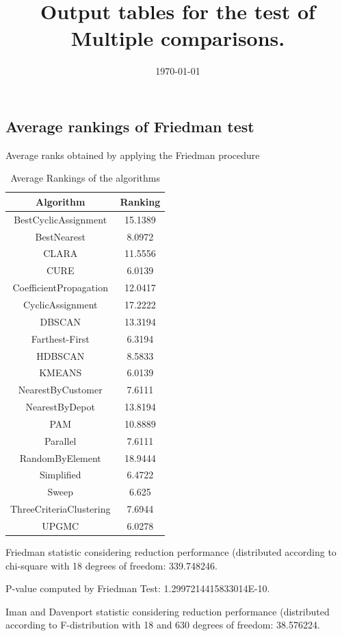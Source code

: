 \documentclass[a4paper,10pt]{article}
\title{Output tables for the test of Multiple comparisons.}
\author{}
\date{\today}
\begin{document}
\begin{landscape}
\pagestyle{empty}
\maketitle
\thispagestyle{empty}
\section{Average rankings of Friedman test}



Average ranks obtained by applying the Friedman procedure

\begin{table}[!htp]
\centering
\begin{tabular}{|c|c|}\hline
Algorithm&Ranking\\\hline
BestCyclicAssignment & 15.1389\\
BestNearest & 8.0972\\
CLARA & 11.5556\\
CURE & 6.0139\\
CoefficientPropagation & 12.0417\\
CyclicAssignment & 17.2222\\
DBSCAN & 13.3194\\
Farthest-First & 6.3194\\
HDBSCAN & 8.5833\\
KMEANS & 6.0139\\
NearestByCustomer & 7.6111\\
NearestByDepot & 13.8194\\
PAM & 10.8889\\
Parallel & 7.6111\\
RandomByElement & 18.9444\\
Simplified & 6.4722\\
Sweep & 6.625\\
ThreeCriteriaClustering & 7.6944\\
UPGMC & 6.0278\\
\hline
\end{tabular}
\caption{Average Rankings of the algorithms}
\end{table}

Friedman statistic considering reduction performance (distributed according to chi-square with 18 degrees of freedom: 339.748246.

P-value computed by Friedman Test: 1.2997214415833014E-10.\newline

Iman and Davenport statistic considering reduction performance (distributed according to F-distribution with 18 and 630 degrees of freedom: 38.576224.


\end{landscape}
\end{document}

